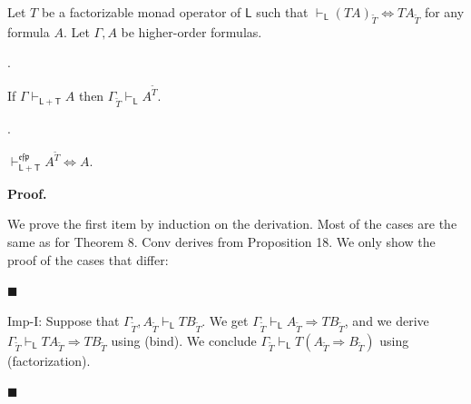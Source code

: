 \documentclass[10pt,a4paper]{article}
\begin{document}
 
Let $T$ be a factorizable monad operator of $\mathsf{L}$ such that $\vdash_{\mathsf{L}}(TA)_{\widetilde{T}}\Leftrightarrow TA_{\widetilde{T}}$ for any formula $A$. Let $\Gamma,A$ be higher-order formulas.\par
  
\par{}. 
 
If $\Gamma\vdash_{\mathsf{L}+\mathsf{T}}A$ then $\Gamma_{\widetilde{T}}\vdash_{\mathsf{L}}A^{\widetilde{T}}$.\par
 
 
 
\par{}. 
 
$\vdash_{\mathsf{L}+\mathsf{T}}^{\mathfrak{e}\mathfrak{f}\mathfrak{p}}A^{\widetilde{T}}\Leftrightarrow A$.\par
 
 
  
 
 
 
\par\medskip\noindent\textbf{Proof.}\par
 
 
We prove the first item by induction on the derivation. Most of the cases are the same as for Theorem 8. Conv derives from Proposition 18. We only show the proof of the cases that differ:\par
  
\par\noindent  $\blacksquare$ 
 
Imp-I: Suppose that $\Gamma_{\widetilde{T}},A_{\widetilde{T}}\vdash_{\mathsf{L}}TB_{\widetilde{T}}$. We get $\Gamma_{\widetilde{T}}\vdash_{\mathsf{L}}A_{\widetilde{T}}\mathbin{\Rightarrow}TB_{\widetilde{T}}$, and we derive $\Gamma_{\widetilde{T}}\vdash_{\mathsf{L}}TA_{\widetilde{T}}\mathbin{\Rightarrow}TB_{\widetilde{T}}$ using (bind). We conclude $\Gamma_{\widetilde{T}}\vdash_{\mathsf{L}}T(A_{\widetilde{T}}\mathbin{\Rightarrow}B_{\widetilde{T}})$ using (factorization).\par
 
 
 
\par\noindent  $\blacksquare$ 
 
\end{document}

